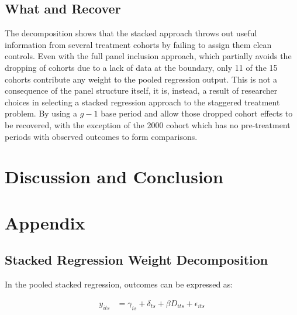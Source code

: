 \documentclass[12pt]{article}
\begin{document}
\subsection{What \textcite{callaway2021difference} and \textcite{sun2021estimating} Recover}

The decomposition shows that the stacked approach throws out useful information from several treatment cohorts by failing to assign them clean controls. Even with the full panel inclusion approach, which partially avoids the dropping of cohorts due to a lack of data at the boundary, only 11 of the 15 cohorts contribute any weight to the pooled regression output. This is not a consequence of the panel structure itself, it is, instead, a result of researcher choices in selecting a stacked regression approach to the staggered treatment problem. By using a $g-1$ base period \textcite{callaway2021difference} and \textcite{sun2021estimating} allow those dropped cohort effects to be recovered, with the exception of the 2000 cohort which has no pre-treatment periods with observed outcomes to form comparisons.


\section{Discussion and Conclusion} \label{sec:discussion}

\newpage

\printbibliography

\newpage

\section*{Appendix}

\setcounter{table}{0}
\setcounter{figure}{0}

\renewcommand{\thetable}{A.\arabic{table}}
\renewcommand{\thefigure}{A.\arabic{figure}}


\subsection*{Stacked Regression Weight Decomposition}

In the pooled stacked regression, outcomes can be expressed as:

\begin{align*}
    y_{its} &= \gamma_{is} + \delta_{ts} + \beta D_{its} + \epsilon_{its}
\end{align*}
\end{document}
